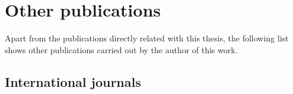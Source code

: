 \chapter{Other publications}
\label{chap:otherpublications}

Apart from the publications directly related with this thesis, the following list shows other publications carried out by the author of this work.

\section{International journals}

